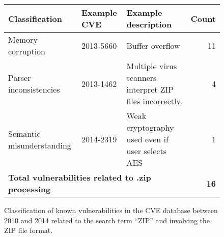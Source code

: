 \begin{figure*}
\centering
\begin{tabular}{lllr}
\toprule
 \bf Classification & \bf Example CVE & \bf Example description & \bf Count\\
\midrule
  Memory corruption & 2013-5660 & Buffer overflow & 11\\
  Parser inconsistencies & 2013-1462 & Multiple virus scanners interpret ZIP files incorrectly.& 4\\
  Semantic misunderstanding & 2014-2319 & Weak cryptography used even if user selects AES & 1\\
  \multicolumn{3}{l}{\bf Total vulnerabilities related to .zip processing }& \bf 16  \\
\bottomrule
  
\end{tabular}
\caption{Classification of known vulnerabilities in the CVE database
between 2010 and 2014 related to the search term ``ZIP'' and involving
the ZIP file format.}
\label{fig:motivation} 
\end{figure*}
